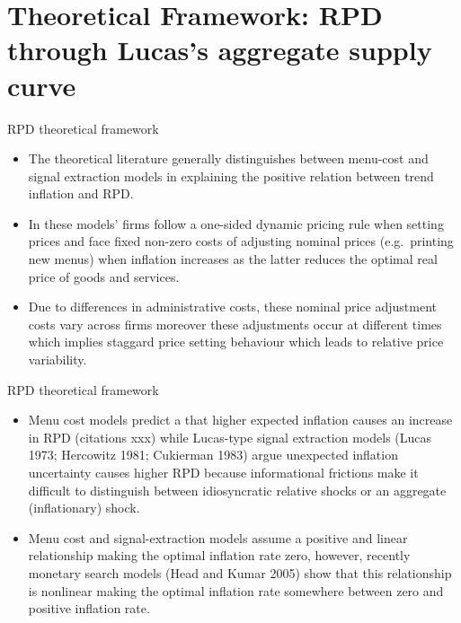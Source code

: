 \documentclass[
  ignorenonframetext,
]{beamer}
\providecommand{\tightlist}{%
  \setlength{\itemsep}{0pt}\setlength{\parskip}{0pt}}\usepackage{longtable,booktabs,array}
\begin{document}
\section{Theoretical Framework: RPD through Lucas's aggregate supply
curve}\label{theoretical-framework-rpd-through-lucass-aggregate-supply-curve}

\begin{frame}{RPD theoretical framework}
\label{rpd-theoretical-framework}
\begin{itemize}
\item
  The theoretical literature generally distinguishes between menu-cost
  and signal extraction models in explaining the positive relation
  between trend inflation and RPD.
\item
  In these models' firms follow a one-sided dynamic pricing rule when
  setting prices and face fixed non-zero costs of adjusting nominal
  prices (e.g.~printing new menus) when inflation increases as the
  latter reduces the optimal real price of goods and services.
\item
  Due to differences in administrative costs, these nominal price
  adjustment costs vary across firms moreover these adjustments occur at
  different times which implies staggard price setting behaviour which
  leads to relative price variability.
\end{itemize}
\end{frame}

\begin{frame}{RPD theoretical framework}
\label{rpd-theoretical-framework-1}
\begin{itemize}
\tightlist
\item
  Menu cost models predict a that higher expected inflation causes an
  increase in RPD (citations xxx) while Lucas-type signal extraction
  models (Lucas 1973; Hercowitz 1981; Cukierman 1983) argue unexpected
  inflation uncertainty causes higher RPD because informational
  frictions make it difficult to distinguish between idiosyncratic
  relative shocks or an aggregate (inflationary) shock.
\item
  Menu cost and signal-extraction models assume a positive and linear
  relationship making the optimal inflation rate zero, however, recently
  monetary search models (Head and Kumar 2005) show that this
  relationship is nonlinear making the optimal inflation rate somewhere
  between zero and positive inflation rate.
\end{itemize}
\end{frame}
\end{document}
